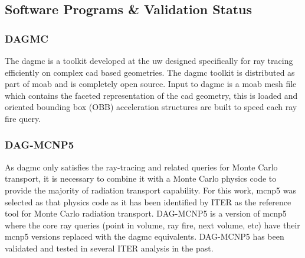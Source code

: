 \documentclass[12pt]{article}
\begin{document}
\newpage
\clearpage
\subsection{Software Programs \& Validation Status}
\subsubsection{DAGMC}
The \gls{dagmc} is a toolkit developed at the \gls{uw}
designed specifically for ray tracing efficiently on complex \gls{cad} based
geometries. The \gls{dagmc} toolkit is distributed as part of \gls{moab} and
is completely open source. Input to \gls{dagmc} is a \gls{moab} mesh file
which contains the faceted representation of the \gls{cad} geometry, this
is loaded and oriented bounding box (OBB) acceleration structures are built
to speed each ray fire query.

\subsubsection{DAG-MCNP5}
As \gls{dagmc} only satisfies the ray-tracing 
and related queries for Monte Carlo transport, it is necessary to combine it
with a Monte Carlo physics code to provide the majority of radiation transport
capability. For this work, \gls{mcnp5} \cite{mcnp} was selected as that physics
code as it has been identified by ITER as the reference tool for Monte Carlo 
radiation transport.  DAG-MCNP5 \cite{dagmc} is a version of \gls{mcnp5} where the core ray
queries (point in volume, ray fire, next volume, etc) have their \gls{mcnp5}
versions replaced with the \gls{dagmc} equivalents. DAG-MCNP5 has been validated
\cite{dagmc_validation} and tested in several ITER analysis in the past.
\end{document}
